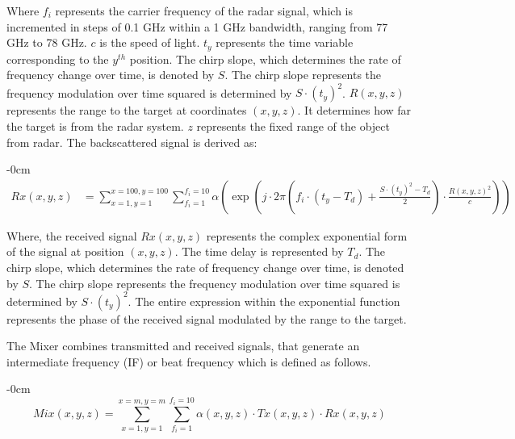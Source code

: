 \documentclass[journal,article,submit,pdftex,moreauthors]{Definitions/mdpi}
\begin{document}
\noindent Where \(f_i\) represents the carrier frequency of the radar signal, which is incremented in steps of 0.1 GHz within a 1 GHz bandwidth, ranging from 77 GHz to 78 GHz. \( c \) is the speed of light. \(t_y\) represents the time variable corresponding to the \(y^{th}\) position. The chirp slope, which determines the rate of frequency change over time, is denoted by \(S\).  The chirp slope represents the frequency modulation over time squared is determined by \(S\cdot (t_y)^2\). \(R(x,y,z)\) represents the range to the target at coordinates \((x,y,z)\). It determines how far the target is from the radar system. \(z\) represents the fixed range of the object from radar. The backscattered signal is derived as:

\begin{adjustwidth}{-\extralength}{0cm}
\begin{equation}
   \begin{aligned}
        Rx(x, y, z) &= \sum_{x=1, y=1}^{x=100, y=100} \sum_{f_i=1}^{f_i=10} \alpha \left( \exp \left( j \cdot 2 \pi \left( f_i \cdot \left( t_y - T_d \right) + \frac{S \cdot (t_y)^2 - T_d}{2} \right) \cdot \frac{R(x, y, z)^2}{c} \right) \right)
   \end{aligned}
\end{equation}
\end{adjustwidth}

\noindent Where, the received signal \( Rx(x, y, z) \) represents the complex exponential form of the signal at position \( (x, y, z) \). The time delay is represented by \( T_d \). The chirp slope, which determines the rate of frequency change over time, is denoted by \(S\).  The chirp slope represents the frequency modulation over time squared is determined by \(S\cdot (t_y)^2\). The entire expression within the exponential function represents the phase of the received signal modulated by the range to the target.

The Mixer combines transmitted and received signals, that generate an intermediate frequency (IF) or beat frequency which is defined as follows. 

\begin{adjustwidth}{-\extralength}{0cm}
\begin{equation}
   {Mix}(x, y, z) = \sum_{x=1, y=1}^{x=m, y=m} \sum_{f_i=1}^{f_i=10} \alpha (x, y, z) \cdot {Tx}(x, y, z) \cdot {Rx}(x, y, z)
\end{equation}
\end{adjustwidth}
\end{document}
